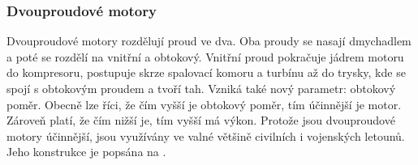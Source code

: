 \subsubsection{Dvouproudové motory}
{Dvouproudové motory rozdělují proud ve dva. Oba proudy se nasají dmychadlem a poté se rozdělí na vnitřní a obtokový. Vnitřní proud pokračuje jádrem motoru do kompresoru, postupuje skrze spalovací komoru a turbínu až do trysky, kde se spojí s obtokovým proudem a tvoří tah. Vzniká také nový parametr: obtokový poměr. Obecně lze říci, že čím vyšší je obtokový poměr, tím účinnější je motor. Zároveň platí, že čím nižší je, tím vyšší má výkon. Protože jsou dvouproudové motory účinnější, jsou využívány ve valné většině civilních i vojenských letounů. Jeho konstrukce je popsána na .}
\cite{VUTB:PrehledTechnickychAspektuVyvojeLeteckychProudovychMotoru}

